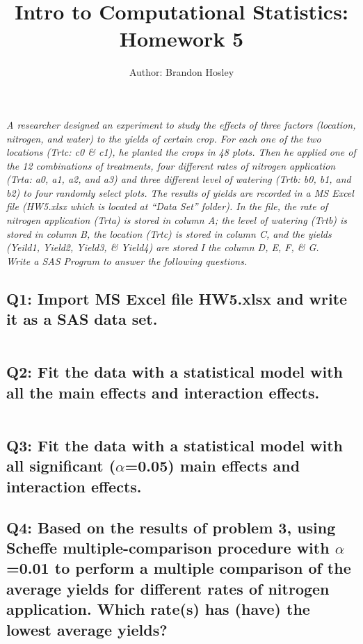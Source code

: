 \documentclass[a4paper,man,natbib]{apa6}
\title{Intro to Computational Statistics: Homework 5}
\author{Author: Brandon Hosley}
\affiliation{Instructor: Liang Kong, Ph.D}
\begin{document}
\maketitle
\singlespacing

\emph{A researcher designed an experiment to study the effects of three factors (location, nitrogen, and water) to the yields of certain crop. For each one of the two locations (Trtc: c0 \& c1), he planted the crops in 48 plots. Then he applied one of the 12 combinations of treatments, four different rates of nitrogen application (Trta: a0, a1, a2, and a3) and three different level of watering (Trtb: b0, b1, and b2) to four randomly select plots. The results of yields are recorded in a MS Excel file (HW5.xlsx which is located at “Data Set” folder). In the file, the rate of nitrogen application (Trta) is stored in column A; the level of watering (Trtb) is stored in column B, the location (Trtc) is stored in column C, and the yields (Yeild1, Yield2, Yield3, \& Yield4) are stored I the column D, E, F, \& G.
\\ Write a SAS Program to answer the following questions.
}
	
\subsection*{Q1: Import MS Excel file HW5.xlsx and write it as a SAS data set. }
\inputminted[breaklines,bgcolor=light-gray]{sas}{./Snippets/DAT502-HW5-1.sas}
% 

\subsection*{Q2: Fit the data with a statistical model with all the main effects and interaction effects. }
\inputminted[breaklines,bgcolor=light-gray]{sas}{./Snippets/DAT502-HW5-2.sas}
% 

\subsection*{Q3: Fit the data with a statistical model with all significant ($\alpha$=0.05) main effects and interaction effects. }
% 

\subsection*{Q4: Based on the results of problem 3, using Scheffe multiple-comparison procedure with $\alpha$=0.01 to perform a multiple comparison of the average yields for different rates of nitrogen application. Which rate(s) has (have) the lowest average yields? }
% 
\end{document}
